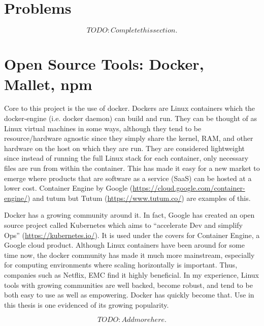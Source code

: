 \section{Problems}
\[TODO: Complete this section.\]

\section{Open Source Tools: Docker, Mallet, npm}
Core to this project is the use of docker. Dockers are Linux containers which the docker-engine (i.e. docker daemon) can build and run. They can be thought of as Linux virtual machines in some ways, although they tend to be resource/hardware agnostic since they simply share the kernel, RAM, and other hardware on the host on which they are run. They are considered lightweight since instead of running the full Linux stack for each container, only necessary files are run from within the container. This has made it easy for a new market to emerge where products that are software as a service (SaaS) can be hosted at a lower cost. Container Engine by Google (\url{https://cloud.google.com/container-engine/}) and tutum but Tutum (\url{https://www.tutum.co/}) are examples of this.

Docker has a growing community around it. In fact, Google has created an open source project called Kubernetes which aims to ``accelerate Dev and simplify Ops'' (\url{https://kubernetes.io/}). It is used under the covers for Container Engine, a Google cloud product. Although Linux containers have been around for some time now, the docker community has made it much more mainstream, especially for computing environments where scaling horizontally is important. Thus, companies such as Netflix, EMC find it highly beneficial. In my experience, Linux tools with growing communities are well backed, become robust, and tend to be both easy to use as well as empowering.
Docker has quickly become that. Use in this thesis is one evidenced of its growing popularity. %

\[TODO: Add more here.\]
